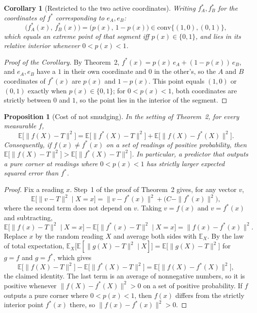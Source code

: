 \documentclass[11pt]{article}
\newtheorem{corollary}{Corollary}
\newtheorem{proposition}{Proposition}
\begin{document}
\begin{corollary}[Restricted to the two active coordinates]
Writing $f^\ast_A, f^\ast_B$ for the coordinates of $f^\ast$ corresponding
to $e_A, e_B$:
\[
  \big(f^\ast_A(x),\, f^\ast_B(x)\big) = \big(p(x),\, 1-p(x)\big) \in
  \mathrm{conv}\{(1,0),(0,1)\},
\]
which equals an extreme point of that segment iff $p(x)\in\{0,1\}$, and
lies in its relative interior whenever $0<p(x)<1$.
\end{corollary}

\begin{proof}[Proof of the Corollary]
By Theorem~2, $f^\ast(x) = p(x)\,e_A + (1-p(x))\,e_B$, and $e_A, e_B$ have a
$1$ in their own coordinate and $0$ in the other's, so the $A$ and $B$
coordinates of $f^\ast(x)$ are $p(x)$ and $1-p(x)$. This point equals
$(1,0)$ or $(0,1)$ exactly when $p(x)\in\{0,1\}$; for $0<p(x)<1$, both
coordinates are strictly between $0$ and $1$, so the point lies in the
interior of the segment.
\end{proof}

\begin{proposition}[Cost of not smudging]
In the setting of Theorem~2, for every measurable $f$,
\[
  \mathbb{E}\big[\|f(X)-T\|^2\big]
  = \mathbb{E}\big[\|f^\ast(X)-T\|^2\big]
  + \mathbb{E}\big[\|f(X)-f^\ast(X)\|^2\big].
\]
Consequently, if $f(x)\neq f^\ast(x)$ on a set of readings of positive
probability, then $\mathbb{E}\big[\|f(X)-T\|^2\big] >
\mathbb{E}\big[\|f^\ast(X)-T\|^2\big]$. In particular, a predictor that
outputs a pure corner at readings where $0<p(x)<1$ has strictly larger
expected squared error than $f^\ast$.
\end{proposition}

\begin{proof}
Fix a reading $x$. Step~1 of the proof of Theorem~2 gives, for any vector
$v$,
\[
  \mathbb{E}\big[\|v-T\|^2 \mid X=x\big] = \|v-f^\ast(x)\|^2 + \big(C-\|f^\ast(x)\|^2\big),
\]
where the second term does not depend on $v$. Taking $v=f(x)$ and $v=f^\ast(x)$
and subtracting,
\[
  \mathbb{E}\big[\|f(x)-T\|^2 \mid X=x\big] - \mathbb{E}\big[\|f^\ast(x)-T\|^2 \mid X=x\big]
  = \|f(x)-f^\ast(x)\|^2.
\]
Replace $x$ by the random reading $X$ and average both sides with $\mathbb{E}_X$.
By the law of total expectation,
$\mathbb{E}_X\big[\mathbb{E}[\|g(X)-T\|^2 \mid X]\big] = \mathbb{E}\big[\|g(X)-T\|^2\big]$
for $g=f$ and $g=f^\ast$, which gives
\[
  \mathbb{E}\big[\|f(X)-T\|^2\big] - \mathbb{E}\big[\|f^\ast(X)-T\|^2\big]
  = \mathbb{E}\big[\|f(X)-f^\ast(X)\|^2\big],
\]
the claimed identity. The last term is an average of nonnegative numbers, so it
is positive whenever $\|f(X)-f^\ast(X)\|^2>0$ on a set of positive
probability. If $f$ outputs a pure corner where $0<p(x)<1$, then $f(x)$ differs
from the strictly interior point $f^\ast(x)$ there, so $\|f(x)-f^\ast(x)\|^2>0$.
\end{proof}
\end{document}
